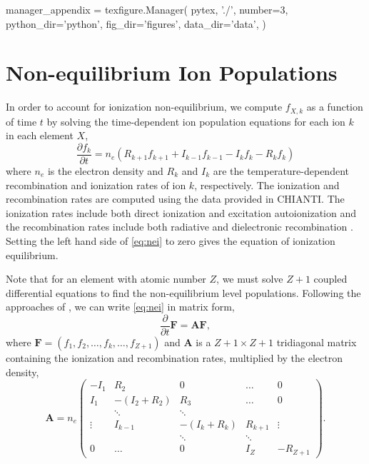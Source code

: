 \begin{pycode}
manager_appendix = texfigure.Manager(
    pytex, './',
    number=3,
    python_dir='python',
    fig_dir='figures',
    data_dir='data',
)
\end{pycode}
\section{Non-equilibrium Ion Populations}\label{nei}

In order to account for ionization non-equilibrium, we compute $f_{X,k}$ as a function of time $t$ by solving the time-dependent ion population equations for each ion $k$ in each element $X$,
\begin{equation}\label{eq:nei}
    \frac{\partial f_k}{\partial t} = n_e(R_{k+1}f_{k+1} + I_{k-1}f_{k-1} - I_kf_k - R_kf_k)
\end{equation}
where $n_e$ is the electron density and $R_k$ and $I_k$ are the temperature-dependent recombination and ionization rates of ion $k$, respectively. The ionization and recombination rates are computed using the data provided in CHIANTI. The ionization rates include both direct ionization and excitation autoionization and the recombination rates include both radiative and dielectronic recombination \citep[see section 6 of][]{young_chianti_2016}. Setting the left hand side of \autoref{eq:nei} to zero gives the equation of ionization equilibrium.

Note that for an element with atomic number $Z$, we must solve $Z+1$ coupled differential equations to find the non-equilibrium level populations. Following the approaches of \citet{masai_x-ray_1984,hughes_self-consistent_1985,shen_lagrangian_2015}, we can write \autoref{eq:nei} in matrix form,
\begin{equation}\label{eq:nei_mat}
    \frac{\partial}{\partial t}\mathbf{F} = \mathbf{A}\mathbf{F},
\end{equation}
where $\mathbf{F}=(f_1,f_2,\ldots,f_k,\ldots,f_{Z+1})$ and $\mathbf{A}$ is a ${Z+1\times Z+1}$ tridiagonal matrix containing the ionization and recombination rates, multiplied by the electron density,
\begin{equation}\label{eq:rate_mat}
    \mathbf{A} = n_e
        \begin{pmatrix}
            -I_1 & R_2 & 0 & \dots & 0 \\
            I_1 & -(I_2 + R_2) & R_3 & \dots & 0 \\
             & \ddots & \ddots & &  \\
            \vdots & I_{k-1} & -(I_k + R_k) & R_{k+1} & \vdots \\
             & & \ddots & \ddots & \\
            0 & \dots & 0 & I_{Z} & -R_{Z+1} 
        \end{pmatrix}.
\end{equation}

